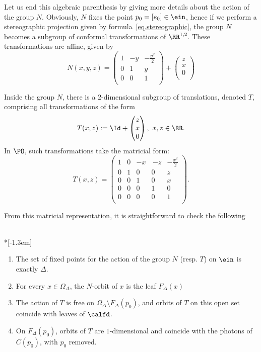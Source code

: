 Let us end this algebraic parenthesis by giving more details about the action of the group $N$. Obviously, $N$ fixes the point $p_0=[e_0] \in \ein$, hence if we perform a stereographic projection given by formula~\eqref{eq.stereographic}, the group $N$ becomes a subgroup of conformal transformations of $\RR^{1,2}$. These transformations are affine, given by
\begin{equation}\label{eq.formuleaffine}
N(x,y,z)=
\begin{pmatrix}
1&-y&-\frac{y^2}{2}\\ 0&1&y\\0&0&1\\
\end{pmatrix} + 
\begin{pmatrix} z\\ x\\ 0 \\
\end{pmatrix}
\end{equation}

Inside the group $N$, there is a $2$-dimensional subgroup of translations, denoted $T$, comprising all transformations of the form
\[
T(x,z):=\Id + 
\begin{pmatrix} z\\ x\\ 0 \\
\end{pmatrix}, \ x,z \in \RR.
\]
In $\PO$, such transformations take the matricial form:
\[
T(x,z)=
\begin{pmatrix}
1&0&-x&\, {-z}& -\frac{x^2}{2}\\
0&1&0&0&z\\
0&0&1&0&x\\
0&0&0&1&0\\
0&0&0&0&1\\
\end{pmatrix}.
\]

From this matricial representation, it is straightforward to check the following

\begin{fact}\label{fact.action}\ \\*[-1.3em]
\begin{enumerate}
\item \label{7.2.1} The set of fixed points for the action of the group $N$ (resp. $T$) on $\ein$ is exactly $\Delta$.
\item \label{7.2.2} For every $x \in \Omega_{\Delta}$, the $N$-orbit of $x$ is the leaf $F_{\Delta}(x)$
\item \label{7.2.3} The action of $T$ is free on $\Omega_{\Delta} \setminus F_{\Delta}(p_0)$, and orbits of $T$ on this open set coincide with leaves of $\calfd$.
\item \label{7.2.4} On $ F_{\Delta}(p_0)$, orbits of $T$ are $1$-dimensional and coincide with the photons of $C(p_0)$, with $p_0$ removed.
\end{enumerate}
\end{fact}

